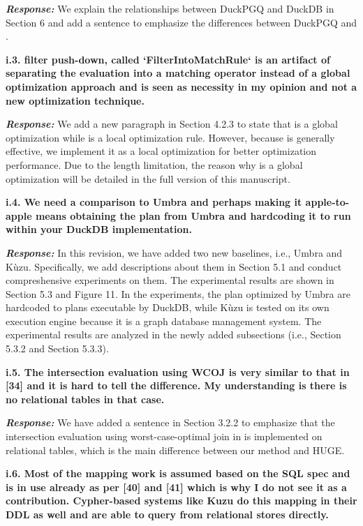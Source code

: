 \textbf{\textit{Response: }}
We explain the relationships between DuckPGQ and DuckDB in Section 6 and add a sentence to emphasize the differences between DuckPGQ and \name.


\textbf{i.3. filter push-down, called `FilterIntoMatchRule` is an artifact of separating the evaluation into a matching operator instead of a global optimization approach and is seen as necessity in my opinion and not a new optimization technique.}

\textbf{\textit{Response: }} We add a new paragraph in Section 4.2.3 to state that \filterrule is a global optimization while \fusionrule is a local optimization rule.
However, because \filterrule is generally effective, we implement it as a local optimization for better optimization performance.
Due to the length limitation, the reason why \filterrule is a global optimization will be detailed in the full version of this manuscript.


\textbf{
i.4. We need a comparison to Umbra and perhaps making it apple-to-apple means obtaining the plan from Umbra and hardcoding it to run within your DuckDB implementation.
}

\textbf{\textit{Response: }} In this revision, we have added two new baselines, i.e., Umbra and K\`uzu.
Specifically, we add descriptions about them in Section 5.1 and conduct compreshensive experiments on them.
The experimental results are shown in Section 5.3 and Figure 11.
In the experiments, the plan optimized by Umbra are hardcoded to plans executable by DuckDB, while K\`uzu is tested on its own execution engine because it is a graph database management system.
The experimental results are analyzed in the newly added subsections (i.e., Section 5.3.2 and Section 5.3.3).


\textbf{
i.5. The intersection evaluation using WCOJ is very similar to that in [34] and it is hard to tell the difference. My understanding is there is no relational tables in that case.}

\textbf{\textit{Response: }}
We have added a sentence in Section 3.2.2 to emphasize that the intersection evaluation using worst-case-optimal join in \name is implemented on relational tables, which is the main difference between our method and HUGE.


\textbf{
i.6. Most of the mapping work is assumed based on the SQL spec and is in use already as per [40] and [41] which is why I do not see it as a contribution. Cypher-based systems like Kuzu do this mapping in their DDL as well and are able to query from relational stores directly.}

